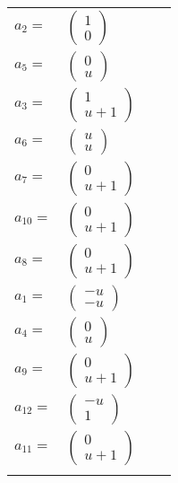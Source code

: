 \documentclass[1p]{elsarticle_modified}
\theoremstyle{definition}
\begin{document}
\begin{tabular}{m{7pt} m{180pt} m{7pt} m{180pt} }
\flushright $a_{2}=$&$\begin{pmatrix}1\\0\end{pmatrix}$ \\
\flushright $a_{5}=$&$\begin{pmatrix}0\\u\end{pmatrix}$ \\
\flushright $a_{3}=$&$\begin{pmatrix}1\\u+1\end{pmatrix}$ \\
\flushright $a_{6}=$&$\begin{pmatrix}u\\u\end{pmatrix}$ \\
\flushright $a_{7}=$&$\begin{pmatrix}0\\u+1\end{pmatrix}$ \\
\flushright $a_{10}=$&$\begin{pmatrix}0\\u+1\end{pmatrix}$ \\
\flushright $a_{8}=$&$\begin{pmatrix}0\\u+1\end{pmatrix}$ \\
\flushright $a_{1}=$&$\begin{pmatrix}- u\\- u\end{pmatrix}$ \\
\flushright $a_{4}=$&$\begin{pmatrix}0\\u\end{pmatrix}$ \\
\flushright $a_{9}=$&$\begin{pmatrix}0\\u+1\end{pmatrix}$ \\
\flushright $a_{12}=$&$\begin{pmatrix}- u\\1\end{pmatrix}$ \\
\flushright $a_{11}=$&$\begin{pmatrix}0\\u+1\end{pmatrix}$\\&\end{tabular}
\end{document}
